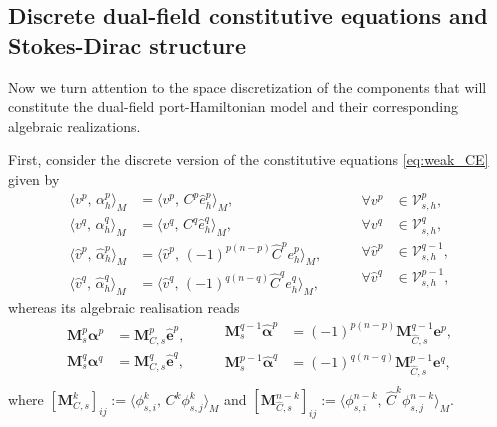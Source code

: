 \documentclass{elsarticle}
\newcommand*{\dual}[1]{\ensuremath{\widehat{#1}}}
\newcommand{\inpr}[3][]{\ensuremath{\langle #2, \, #3 \rangle_{#1}}}
\begin{document}
\subsection{Discrete dual-field constitutive equations and Stokes-Dirac structure}
Now we turn attention to the space discretization of the components that will constitute the dual-field port-Hamiltonian model and their corresponding algebraic realizations.

First, consider the discrete version of the constitutive equations \eqref{eq:weak_CE} given by
\begin{equation}
     \begin{aligned}
     \inpr[M]{{v}^p}{\alpha^p_h} &= \inpr[M]{{v}^p}{C^p \dual{e}^p_h}, \\
      \inpr[M]{{v}^q}{\alpha^q_h} &= \inpr[M]{{v}^q}{C^q \dual{e}^q_h}, \\
      \inpr[M]{\dual{v}^p}{\dual{\alpha}^p_h} &= \inpr[M]{\dual{v}^p}{(-1)^{p(n-p)}\dual{C}^p e^p_h}, \\
      \inpr[M]{\dual{v}^q}{\dual{\alpha}^q_h} &= \inpr[M]{\dual{v}^q}{(-1)^{q(n-q)} \dual{C}^q e^q_h}, 
     \end{aligned} \qquad 
     \begin{aligned}
    \forall v^p &\in \mathcal{V}^p_{s, h}, \\
    \forall v^q &\in \mathcal{V}^q_{s, h}, \\
    \forall \dual{v}^p &\in \mathcal{V}^{q-1}_{s, h}, \\
    \forall \dual{v}^q &\in \mathcal{V}^{p-1}_{s, h}, \\
    \end{aligned}
\end{equation}
whereas its algebraic realisation reads
\begin{equation}\label{eq:discr_CE}
    \begin{aligned}
     \mathbf{M}_{s}^p \bm{\alpha}^p &= \mathbf{M}_{C, s}^p \dual{\mathbf{e}}^p, \\
     \mathbf{M}_s^q \bm{\alpha}^q &= \mathbf{M}_{C, s}^q \dual{\mathbf{e}}^q, \\
     \end{aligned} \qquad 
     \begin{aligned}
     \mathbf{M}_{s}^{q-1} \dual{\bm{\alpha}}^p &= (-1)^{p(n-p)}\mathbf{M}_{\dual{C}, s}^{q-1} {\mathbf{e}}^p, \\
     \mathbf{M}_{s}^{p-1} \dual{\bm{\alpha}}^q &= (-1)^{q(n-q)}\mathbf{M}_{\dual{C}, s}^{p-1} \mathbf{e}^q, \\
    \end{aligned}
\end{equation}
where $[\mathbf{M}_{C, s}^k]_{ij} := \inpr[M]{\phi^k_{s, i}}{C^k \phi^k_{s, j}}$ and $[\mathbf{M}_{\dual{C}, s}^{n-k}]_{ij} := \inpr[M]{\phi^{n-k}_{s, i}}{\dual{C}^k \phi^{n-k}_{s, j}}$. 
\end{document}
